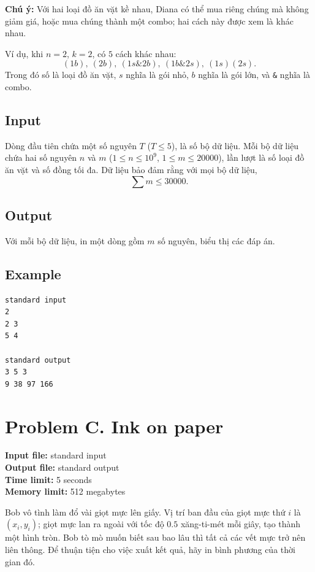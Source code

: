 \documentclass[11pt]{article}
\begin{document}
\textbf{Chú ý:} Với hai loại đồ ăn vặt kề nhau, Diana có thể mua riêng chúng
mà không giảm giá, hoặc mua chúng thành một combo; hai cách này được xem là
khác nhau.

Ví dụ, khi $n=2$, $k=2$, có $5$ cách khác nhau:
\[
  (1b),\ (2b),\ (1s\&2b),\ (1b\&2s),\ (1s)(2s).
\]
Trong đó số là loại đồ ăn vặt, $s$ nghĩa là gói nhỏ, $b$ nghĩa là gói lớn, và
\texttt{\&} nghĩa là combo.

\subsection*{Input}

Dòng đầu tiên chứa một số nguyên $T$ ($T\le 5$), là số bộ dữ liệu. Mỗi bộ dữ
liệu chứa hai số nguyên $n$ và $m$
($1\le n\le 10^9$, $1\le m\le 20000$), lần lượt là số loại đồ ăn vặt và số
đồng tối đa. Dữ liệu bảo đảm rằng với mọi bộ dữ liệu,
\[
  \sum m \le 30000.
\]

\subsection*{Output}

Với mỗi bộ dữ liệu, in một dòng gồm $m$ số nguyên, biểu thị các đáp án.

\subsection*{Example}

\begin{verbatim}
standard input
2
2 3
5 4

standard output
3 5 3
9 38 97 166
\end{verbatim}

\section{Problem C. Ink on paper}

\noindent
\textbf{Input file:} standard input\\
\textbf{Output file:} standard output\\
\textbf{Time limit:} 5 seconds\\
\textbf{Memory limit:} 512 megabytes

Bob vô tình làm đổ vài giọt mực lên giấy. Vị trí ban đầu của giọt mực thứ $i$
là $(x_i,y_i)$; giọt mực lan ra ngoài với tốc độ $0.5$ xăng-ti-mét mỗi giây,
tạo thành một hình tròn. Bob tò mò muốn biết sau bao lâu thì tất cả các vết
mực trở nên liên thông. Để thuận tiện cho việc xuất kết quả, hãy in bình
phương của thời gian đó.
\end{document}
